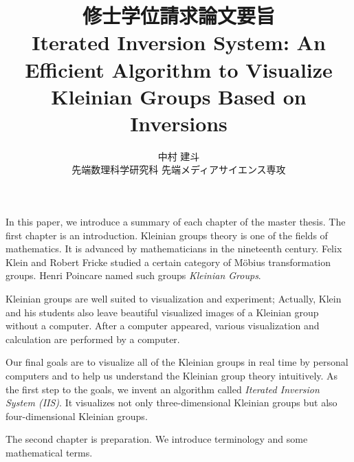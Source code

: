 \documentclass[uplatex, dvipdfmx]{article}
\title{修士学位請求論文要旨\\
 Iterated Inversion System: An Efficient Algorithm to Visualize Kleinian Groups Based on Inversions }
\author{中村 建斗\\
先端数理科学研究科 先端メディアサイエンス専攻\\
}
\date{}
\begin{document}
\maketitle
\pagestyle{plain}
\newpage

In this paper, we introduce a summary of each chapter of the master thesis.
The first chapter is an introduction.
Kleinian groups theory is one of the fields of mathematics.
It is advanced by mathematicians in the nineteenth century.
Felix Klein and Robert Fricke studied a certain category of M\"obius
transformation groups.
Henri Poincare named such groups \textit{Kleinian Groups}.

Kleinian groups are well suited to visualization and
experiment; Actually, Klein and his students also leave beautiful
visualized images of a Kleinian group without a computer.
After a computer appeared, various visualization and calculation are
performed by a computer.

Our final goals are to visualize all of the Kleinian groups in real time
by personal computers and to help us understand the Kleinian group theory
intuitively.
As the first step to the goals, we invent an algorithm called
\textit{Iterated Inversion System (IIS)}.
It visualizes not only three-dimensional Kleinian groups but also
four-dimensional Kleinian groups.

The second chapter is preparation.
We introduce terminology and some mathematical terms.
\end{document}
